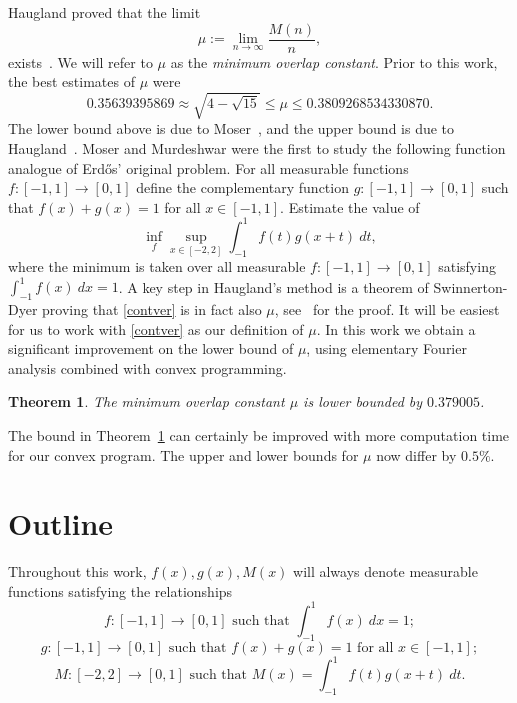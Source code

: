 \documentclass[12pt]{article}
\newtheorem{theorem}{Theorem}%
\numberwithin{equation}{section}
\begin{document}
Haugland proved that the limit 
\[ \mu:= \lim_{n \to \infty} \frac{M(n)}{n},\]
exists~\cite{H1}. We will refer to $\mu$ as the \emph{minimum overlap constant}. Prior to this work, the best estimates of $\mu$ were 
\[ 0.35639395869 \approx \sqrt{4-\sqrt{15}}  \leq \mu \leq 0.3809268534330870 .\]
The lower bound above is due to Moser~\cite{M}, and the upper bound is due to Haugland~\cite{H2}. Moser and Murdeshwar were the first to study the following function analogue of Erd\H{o}s' original problem. For all measurable functions $f \colon [-1,1] \to [0,1]$ define the complementary function $g \colon [-1,1] \to [0,1]$ such that $f(x) + g(x) = 1$ for all $x \in [-1,1]$. Estimate the value of
\begin{equation}\label{contver} \inf_{f} \sup_{x \in [-2,2]} \int_{-1}^1 f(t)g(x+t) \ dt,\end{equation}
where the minimum is taken over all measurable $f \colon [-1,1] \to [0,1]$ satisfying $\int_{-1}^1 f(x) \ dx = 1$. A key step in Haugland's method is a theorem of Swinnerton-Dyer proving that \eqref{contver} is in fact also $\mu$, see~\cite{H1} for the proof. It will be easiest for us to work with \eqref{contver} as our definition of $\mu$. In this work we obtain a significant improvement on the lower bound of $\mu$, using elementary Fourier analysis combined with convex programming.


\begin{theorem}\label{T1} The minimum overlap constant $\mu$ is lower bounded by $0.379005$.
\end{theorem} 

The bound in Theorem~\ref{T1} can certainly be improved with more computation time for our convex program. The upper and lower bounds for $\mu$ now differ by $0.5\%$. 





\section{Outline}

Throughout this work, $f(x),g(x),M(x)$ will always denote measurable functions satisfying the relationships
\[ f \colon [-1,1] \to [0,1] \text{ such that } \int_{-1}^1 f(x) \ dx = 1;\]
\[ g \colon [-1,1] \to [0,1] \text{ such that } f(x) + g(x) = 1 \text{ for all } x \in [-1,1];\]
\begin{equation}\label{fgm} M \colon [-2,2] \to [0,1] \text{ such that } M(x) = \int_{-1}^1 f(t) g(x+t) \ dt.\end{equation}
\end{document}
